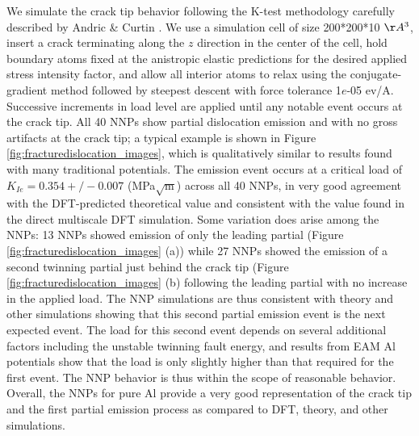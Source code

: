 \documentclass{article}
\begin{document}
We simulate the crack tip behavior following the K-test methodology carefully described by Andric \& Curtin \cite{Andric2019AtomisticFracture}.  We use a simulation cell of size 200*200*10 $\AA^3$, insert a crack terminating along the $z$ direction in the center of the cell, hold boundary atoms fixed at the anistropic elastic predictions for the desired applied stress intensity factor, and allow all interior atoms to relax using the conjugate-gradient method followed by steepest descent with force tolerance 1$e$-05 ev/A.  Successive increments in load level are applied until any notable event occurs at the crack tip.
All 40 NNPs show partial dislocation emission and with no gross artifacts at the crack tip; a typical example is shown in Figure \ref{fig:fracturedislocation_images}, which is qualitatively similar to results found with many traditional potentials.  The emission event occurs at a critical load of $K_{Ie}=0.354+/-0.007$ (MPa$\sqrt{\text{m}}$) across all 40 NNPs, in very good agreement with the DFT-predicted theoretical value and consistent with the value found in the direct multiscale DFT simulation.  Some variation does arise among the NNPs: 13 NNPs showed emission of only the leading partial (Figure \ref{fig:fracturedislocation_images} (a)) while 27 NNPs showed the emission of a second twinning partial just behind the crack tip (Figure \ref{fig:fracturedislocation_images} (b) following the leading partial with no increase in the applied load.  The NNP simulations are thus consistent with theory and other simulations showing that this second partial emission event is the next expected event.  The load for this second event depends on several additional factors including the unstable twinning fault energy, and results from EAM Al potentials show that the load is only slightly higher than that required for the first event.  The NNP behavior is thus within the scope of reasonable behavior.  Overall, the NNPs for pure Al provide a very good representation of the crack tip and the first partial emission process as compared to DFT, theory, and other simulations.
\end{document}
